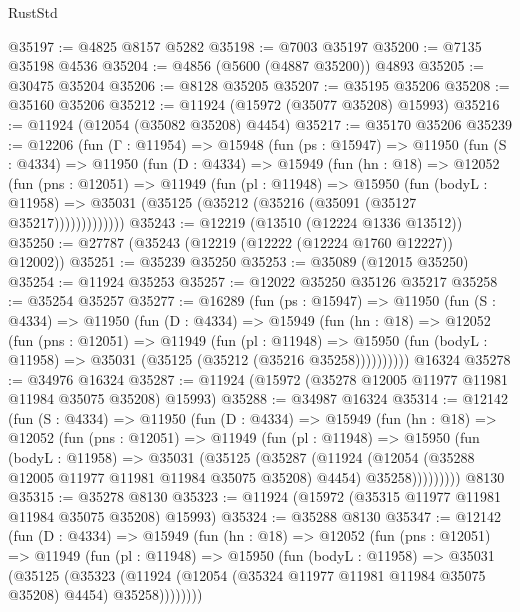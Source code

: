\begin{lexlean}{RustStd}
\begin{coremodule}
{\begin{coremodule}
{{{{{{{{{{{{{{{{{{{{{{{{{{{{{{{{{{{{{{{{{{{{{{{{{{{{{{{{{{{{{{{{{{{{{{{{{{{{{{{{@35197 := @4825 @8157 @5282
@35198 := @7003 @35197
@35200 := @7135 @35198 @4536
@35204 := @4856 (@5600 (@4887 @35200)) @4893
@35205 := @30475 @35204
@35206 := @8128 @35205
@35207 := @35195 @35206
@35208 := @35160 @35206
@35212 := @11924 (@15972 (@35077 @35208) @15993)
@35216 := @11924 (@12054 (@35082 @35208) @4454)
@35217 := @35170 @35206
@35239 := @12206
    (fun (Γ : @11954) =>
    @15948
      (fun (ps : @15947) =>
      @11950
        (fun (S : @4334) =>
        @11950
          (fun (D : @4334) =>
          @15949
            (fun (hn : @18) =>
            @12052
              (fun (pns : @12051) =>
              @11949
                (fun (pl : @11948) =>
                @15950
                  (fun (bodyL : @11958) =>
                  @35031 (@35125 (@35212 (@35216 (@35091 (@35127 @35217)))))))))))))
@35243 := @12219 (@13510 (@12224 @1336 @13512))
@35250 := @27787 (@35243 (@12219 (@12222 (@12224 @1760 @12227)) @12002))
@35251 := @35239 @35250
@35253 := @35089 (@12015 @35250)
@35254 := @11924 @35253
@35257 := @12022 @35250 @35126 @35217
@35258 := @35254 @35257
@35277 := @16289
    (fun (ps : @15947) =>
    @11950
      (fun (S : @4334) =>
      @11950
        (fun (D : @4334) =>
        @15949
          (fun (hn : @18) =>
          @12052
            (fun (pns : @12051) =>
            @11949
              (fun (pl : @11948) =>
              @15950 (fun (bodyL : @11958) => @35031 (@35125 (@35212 (@35216 @35258))))))))))
    @16324
@35278 := @34976 @16324
@35287 := @11924 (@15972 (@35278 @12005 @11977 @11981 @11984 @35075 @35208) @15993)
@35288 := @34987 @16324
@35314 := @12142
    (fun (S : @4334) =>
    @11950
      (fun (D : @4334) =>
      @15949
        (fun (hn : @18) =>
        @12052
          (fun (pns : @12051) =>
          @11949
            (fun (pl : @11948) =>
            @15950
              (fun (bodyL : @11958) =>
              @35031
                (@35125
                  (@35287
                    (@11924
                      (@12054 (@35288 @12005 @11977 @11981 @11984 @35075 @35208) @4454)
                      @35258)))))))))
    @8130
@35315 := @35278 @8130
@35323 := @11924 (@15972 (@35315 @11977 @11981 @11984 @35075 @35208) @15993)
@35324 := @35288 @8130
@35347 := @12142
    (fun (D : @4334) =>
    @15949
      (fun (hn : @18) =>
      @12052
        (fun (pns : @12051) =>
        @11949
          (fun (pl : @11948) =>
          @15950
            (fun (bodyL : @11958) =>
            @35031
              (@35125
                (@35323
                  (@11924 (@12054 (@35324 @11977 @11981 @11984 @35075 @35208) @4454) @35258))))))))
}}}}}}}}}}}}}}}}}}}}}}}}}}}}}}}}}}}}}}}}}}}}}}}}}}}}}}}}}}}}}}}}}}}}}}}}}}}}}}}}
\end{coremodule}}
\end{coremodule}
\end{lexlean}
